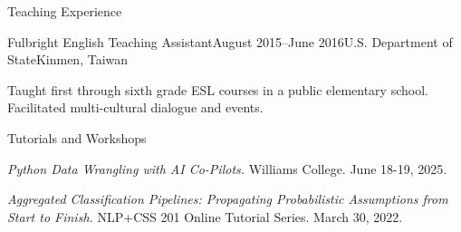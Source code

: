 \documentclass{resume} %
\begin{document}
\begin{rSection}{Teaching Experience}

\begin{rSubsection}{Fulbright English Teaching Assistant}{August 2015--June 2016}{U.S. Department of State}{Kinmen, Taiwan}
\item Taught first through sixth grade ESL courses in a public elementary school. Facilitated multi-cultural dialogue and events.
\end{rSubsection}

\begin{rSubsection}{Tutorials and Workshops}{}{}{}
\item \emph{Python Data Wrangling with AI Co-Pilots.} Williams College. June 18-19, 2025. 
\item \emph{Aggregated Classification Pipelines: Propagating Probabilistic Assumptions from Start to Finish.} NLP+CSS 201 Online Tutorial Series. March 30, 2022. 
\end{rSubsection}


\end{rSection}

\end{document}
